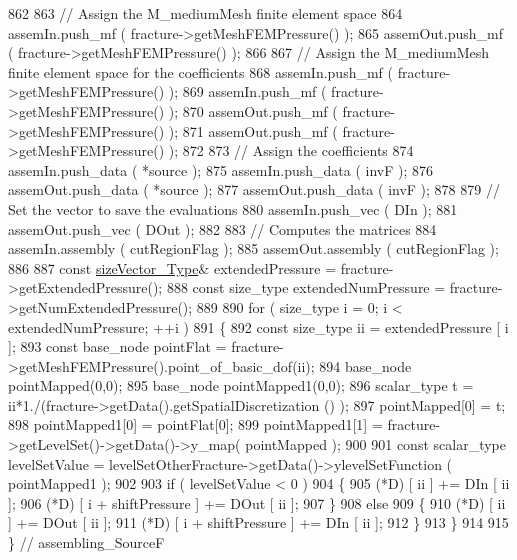 \begin{DoxyCode}
862 
863     \textcolor{comment}{// Assign the M\_mediumMesh finite element space}
864     assemIn.push\_mf ( fracture->getMeshFEMPressure() );
865     assemOut.push\_mf ( fracture->getMeshFEMPressure() );
866 
867     \textcolor{comment}{// Assign the M\_mediumMesh finite element space for the coefficients}
868     assemIn.push\_mf ( fracture->getMeshFEMPressure() );
869     assemIn.push\_mf ( fracture->getMeshFEMPressure() );
870     assemOut.push\_mf ( fracture->getMeshFEMPressure() );
871     assemOut.push\_mf ( fracture->getMeshFEMPressure() );
872 
873     \textcolor{comment}{// Assign the coefficients}
874     assemIn.push\_data ( *source );
875     assemIn.push\_data ( invF );
876     assemOut.push\_data ( *source );
877     assemOut.push\_data ( invF );
878 
879     \textcolor{comment}{// Set the vector to save the evaluations}
880     assemIn.push\_vec ( DIn );
881     assemOut.push\_vec ( DOut );
882 
883     \textcolor{comment}{// Computes the matrices}
884     assemIn.assembly ( cutRegionFlag );
885     assemOut.assembly ( cutRegionFlag );
886 
887     \textcolor{keyword}{const} \hyperlink{Core_8h_a83c51913d041a5001e8683434c09857f}{sizeVector\_Type}& extendedPressure = fracture->getExtendedPressure();
888     \textcolor{keyword}{const} size\_type extendedNumPressure = fracture->getNumExtendedPressure();
889 
890     \textcolor{keywordflow}{for} ( size\_type i = 0; i < extendedNumPressure; ++i )
891     \{
892         \textcolor{keyword}{const} size\_type ii = extendedPressure [ i ];
893         \textcolor{keyword}{const} base\_node pointFlat = fracture->getMeshFEMPressure().point\_of\_basic\_dof(ii);
894         base\_node pointMapped(0,0);
895         base\_node pointMapped1(0,0);
896     scalar\_type t = ii*1./(fracture->getData().getSpatialDiscretization () );
897         pointMapped[0] = t;
898         pointMapped1[0] = pointFlat[0];
899         pointMapped1[1] = fracture->getLevelSet()->getData()->y\_map( pointMapped );
900         
901     \textcolor{keyword}{const} scalar\_type levelSetValue = levelSetOtherFracture->getData()->ylevelSetFunction ( pointMapped1 );
902 
903         \textcolor{keywordflow}{if} ( levelSetValue < 0 )
904         \{
905             (*D) [ ii ] += DIn [ ii ];
906             (*D) [ i + shiftPressure ] += DOut [ ii ];
907         \}
908         \textcolor{keywordflow}{else}
909         \{
910             (*D) [ ii ] += DOut [ ii ];
911             (*D) [ i + shiftPressure ] += DIn [ ii ];
912         \}
913     \}
914 
915 \} \textcolor{comment}{// assembling\_SourceF}
\end{DoxyCode}
